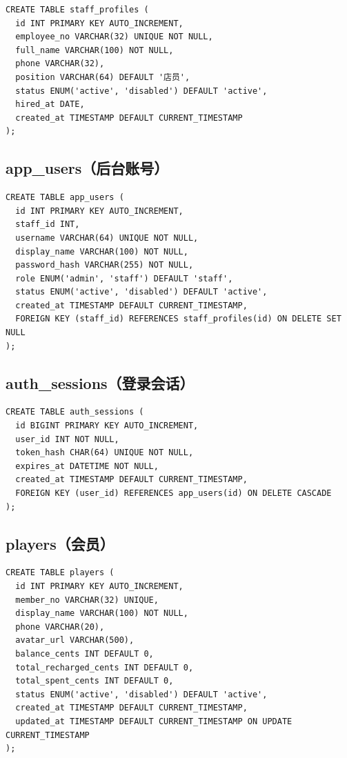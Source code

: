 \begin{verbatim}
CREATE TABLE staff_profiles (
  id INT PRIMARY KEY AUTO_INCREMENT,
  employee_no VARCHAR(32) UNIQUE NOT NULL,
  full_name VARCHAR(100) NOT NULL,
  phone VARCHAR(32),
  position VARCHAR(64) DEFAULT '店员',
  status ENUM('active', 'disabled') DEFAULT 'active',
  hired_at DATE,
  created_at TIMESTAMP DEFAULT CURRENT_TIMESTAMP
);
\end{verbatim}

\subsection{app\_users（后台账号）}

\begin{verbatim}
CREATE TABLE app_users (
  id INT PRIMARY KEY AUTO_INCREMENT,
  staff_id INT,
  username VARCHAR(64) UNIQUE NOT NULL,
  display_name VARCHAR(100) NOT NULL,
  password_hash VARCHAR(255) NOT NULL,
  role ENUM('admin', 'staff') DEFAULT 'staff',
  status ENUM('active', 'disabled') DEFAULT 'active',
  created_at TIMESTAMP DEFAULT CURRENT_TIMESTAMP,
  FOREIGN KEY (staff_id) REFERENCES staff_profiles(id) ON DELETE SET NULL
);
\end{verbatim}

\subsection{auth\_sessions（登录会话）}

\begin{verbatim}
CREATE TABLE auth_sessions (
  id BIGINT PRIMARY KEY AUTO_INCREMENT,
  user_id INT NOT NULL,
  token_hash CHAR(64) UNIQUE NOT NULL,
  expires_at DATETIME NOT NULL,
  created_at TIMESTAMP DEFAULT CURRENT_TIMESTAMP,
  FOREIGN KEY (user_id) REFERENCES app_users(id) ON DELETE CASCADE
);
\end{verbatim}

\subsection{players（会员）}

\begin{verbatim}
CREATE TABLE players (
  id INT PRIMARY KEY AUTO_INCREMENT,
  member_no VARCHAR(32) UNIQUE,
  display_name VARCHAR(100) NOT NULL,
  phone VARCHAR(20),
  avatar_url VARCHAR(500),
  balance_cents INT DEFAULT 0,
  total_recharged_cents INT DEFAULT 0,
  total_spent_cents INT DEFAULT 0,
  status ENUM('active', 'disabled') DEFAULT 'active',
  created_at TIMESTAMP DEFAULT CURRENT_TIMESTAMP,
  updated_at TIMESTAMP DEFAULT CURRENT_TIMESTAMP ON UPDATE CURRENT_TIMESTAMP
);
\end{verbatim}


